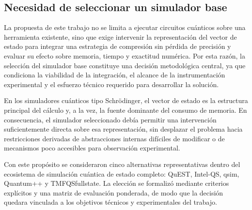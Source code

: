 \subsection{Necesidad de seleccionar un simulador base}

La propuesta de este trabajo no se limita a ejecutar circuitos cuánticos sobre una
herramienta existente, sino que exige intervenir la representación del vector de estado
para integrar una estrategia de compresión sin pérdida de precisión y evaluar su efecto
sobre memoria, tiempo y exactitud numérica. Por esta razón, la selección del simulador
base constituye una decisión metodológica central, ya que condiciona la viabilidad de
la integración, el alcance de la instrumentación experimental y el esfuerzo técnico
requerido para desarrollar la solución.

En los simuladores cuánticos tipo Schrödinger, el vector de estado es la estructura
principal del cálculo y, a la vez, la fuente dominante del consumo de memoria. En
consecuencia, el simulador seleccionado debía permitir una intervención suficientemente
directa sobre esa representación, sin desplazar el problema hacia restricciones
derivadas de abstracciones internas difíciles de modificar o de mecanismos poco
accesibles para observación experimental.

Con este propósito se consideraron cinco alternativas representativas dentro del
ecosistema de simulación cuántica de estado completo: QuEST, Intel-QS, qsim,
Quantum++ y TMFQSfullstate. La elección se formalizó mediante criterios explícitos y
una matriz de evaluación ponderada, de modo que la decisión quedara vinculada a los
objetivos técnicos y experimentales del trabajo.
